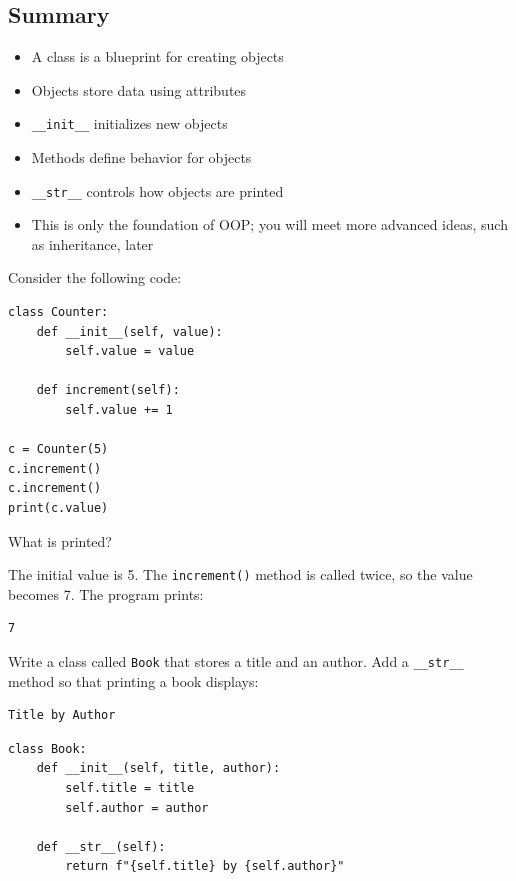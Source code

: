 \subsection{Summary}
\begin{itemize}
    \item A class is a blueprint for creating objects
    \item Objects store data using attributes
    \item \texttt{__init__} initializes new objects
    \item Methods define behavior for objects
    \item \texttt{__str__} controls how objects are printed
    \item This is only the foundation of OOP; you will meet more advanced ideas, such as inheritance, later
\end{itemize}

\begin{Exercise}[label=classes1, title=Tracing an Object]
Consider the following code:
\begin{verbatim}
class Counter:
    def __init__(self, value):
        self.value = value

    def increment(self):
        self.value += 1

c = Counter(5)
c.increment()
c.increment()
print(c.value)
\end{verbatim}

What is printed?
\end{Exercise}

\begin{Answer}[ref=classes1]
The initial value is 5. The \texttt{increment()} method is called twice,
so the value becomes 7. The program prints:
\begin{verbatim}
7
\end{verbatim}
\end{Answer}

\begin{Exercise}[label=classes2, title=Custom Printing]
Write a class called \texttt{Book} that stores a title and an author.
Add a \texttt{__str__} method so that printing a book displays:
\begin{verbatim}
Title by Author
\end{verbatim}
\end{Exercise}

\begin{Answer}[ref=classes2]
\begin{verbatim}
class Book:
    def __init__(self, title, author):
        self.title = title
        self.author = author

    def __str__(self):
        return f"{self.title} by {self.author}"
\end{verbatim}
\end{Answer}

